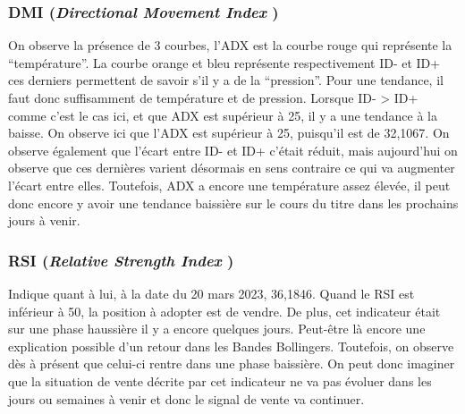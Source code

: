 \documentclass[12pt,a4paper]{article}
\begin{document}
\subsubsection*{DMI (\textit{Directional Movement Index} )}
On observe la présence de 3 courbes, l'ADX est la courbe rouge qui représente la “température”. La courbe orange et bleu représente respectivement ID- et ID+ ces derniers 
permettent de savoir s'il y a de la “pression”. Pour une tendance, il faut donc suffisamment de température et de pression. Lorsque ID- > ID+ comme c'est le cas ici, et 
que ADX est supérieur à 25, il y a une tendance à la baisse. On observe ici que l'ADX est supérieur à 25, puisqu'il est de 32,1067. On observe également que l'écart entre 
ID-  et ID+  c'était réduit, mais aujourd'hui on observe que ces dernières varient désormais en sens contraire ce qui va augmenter l'écart entre elles.
Toutefois, ADX a encore une température assez élevée, il peut donc encore y avoir une tendance baissière sur le cours du titre dans les prochains jours à venir.
\subsubsection*{RSI (\textit{Relative Strength Index} )}
Indique quant à lui, à la date du 20 mars 2023, 36,1846. Quand le RSI est inférieur à 50, la position à adopter est de vendre. De plus, cet indicateur était sur une phase 
haussière il y a encore quelques jours. Peut-être là encore une explication possible d'un retour dans les Bandes Bollingers. Toutefois, on observe dès à présent que 
celui-ci rentre dans une phase baissière. On peut donc imaginer que la situation de vente décrite par cet indicateur ne va pas évoluer dans les jours ou semaines à venir 
et donc le signal de vente va continuer. 
\end{document}
